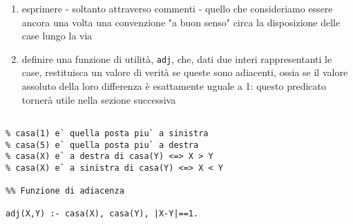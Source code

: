 \begin{enumerate} 
	\item{esprimere - soltanto attraverso commenti - quello che consideriamo essere ancora una volta una convenzione "a buon senso" circa la disposizione delle case lungo la via} 
	\item{definire una funzione di utilità, \texttt{adj}, che, dati due interi rappresentanti le case, restituisca un valore di verità se queste sono adiacenti, ossia se il valore assoluto della loro differenza è esattamente uguale a 1: questo predicato tornerà utile nella sezione successiva} 
\end{enumerate}

\begin{lstlisting}[frame=tb]
%% Convenzioni

% casa(1) e` quella posta piu` a sinistra
% casa(5) e` quella posta piu` a destra
% casa(X) e` a destra di casa(Y) <=> X > Y
% casa(X) e` a sinistra di casa(Y) <=> X < Y

%% Funzione di adiacenza

adj(X,Y) :- casa(X), casa(Y), |X-Y|==1.
\end{lstlisting}
